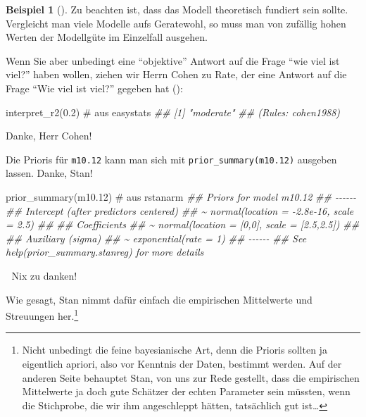 \documentclass[
  ngerman,
  letterpaper,
  twoside,
  open=any]{scrbook}
\newenvironment{Shaded}{\begin{snugshade}}{\end{snugshade}}
\newcommand{\CommentTok}[1]{\textcolor[rgb]{0.37,0.37,0.37}{#1}}
\newcommand{\DocumentationTok}[1]{\textcolor[rgb]{0.37,0.37,0.37}{\textit{#1}}}
\newcommand{\FloatTok}[1]{\textcolor[rgb]{0.68,0.00,0.00}{#1}}
\newcommand{\FunctionTok}[1]{\textcolor[rgb]{0.28,0.35,0.67}{#1}}
\newcommand{\NormalTok}[1]{\textcolor[rgb]{0.00,0.23,0.31}{#1}}
\theoremstyle{definition}
\newtheorem{example}{Beispiel}[chapter]
\theoremstyle{plain}
\theoremstyle{definition}
\theoremstyle{definition}
\theoremstyle{remark}
\begin{document}
\begin{example}[]
Zu beachten ist, dass das Modell theoretisch fundiert sein sollte.
Vergleicht man viele Modelle aufs Geratewohl, so muss man von zufällig
hohen Werten der Modellgüte im Einzelfall ausgehen.

Wenn Sie aber unbedingt eine \enquote{objektive} Antwort auf die Frage
\enquote{wie viel ist viel?} haben wollen, ziehen wir Herrn Cohen zu
Rate, der eine Antwort auf die Frage \enquote{Wie viel ist viel?}
gegeben hat ():

\begin{Shaded}
\begin{Highlighting}[]
\FunctionTok{interpret\_r2}\NormalTok{(}\FloatTok{0.2}\NormalTok{)  }\CommentTok{\# aus \textasciigrave{}easystats\textasciigrave{}}
\DocumentationTok{\#\# [1] "moderate"}
\DocumentationTok{\#\# (Rules: cohen1988)}
\end{Highlighting}
\end{Shaded}

Danke, Herr Cohen!

Die Prioris für \texttt{m10.12} kann man sich mit
\texttt{prior\_summary(m10.12)} ausgeben lassen. Danke, Stan!

\begin{Shaded}
\begin{Highlighting}[]
\FunctionTok{prior\_summary}\NormalTok{(m10}\FloatTok{.12}\NormalTok{)  }\CommentTok{\# aus rstanarm}
\DocumentationTok{\#\# Priors for model \textquotesingle{}m10.12\textquotesingle{} }
\DocumentationTok{\#\# {-}{-}{-}{-}{-}{-}}
\DocumentationTok{\#\# Intercept (after predictors centered)}
\DocumentationTok{\#\#  \textasciitilde{} normal(location = {-}2.8e{-}16, scale = 2.5)}
\DocumentationTok{\#\# }
\DocumentationTok{\#\# Coefficients}
\DocumentationTok{\#\#  \textasciitilde{} normal(location = [0,0], scale = [2.5,2.5])}
\DocumentationTok{\#\# }
\DocumentationTok{\#\# Auxiliary (sigma)}
\DocumentationTok{\#\#  \textasciitilde{} exponential(rate = 1)}
\DocumentationTok{\#\# {-}{-}{-}{-}{-}{-}}
\DocumentationTok{\#\# See help(\textquotesingle{}prior\_summary.stanreg\textquotesingle{}) for more details}
\end{Highlighting}
\end{Shaded}

\begin{displayquote}
🤖 Nix zu danken!
\end{displayquote}

Wie gesagt, Stan nimmt dafür einfach die empirischen Mittelwerte und
Streuungen her.\footnote{Nicht unbedingt die feine bayesianische Art,
  denn die Prioris sollten ja eigentlich apriori, also vor Kenntnis der
  Daten, bestimmt werden. Auf der anderen Seite behauptet Stan, von uns
  zur Rede gestellt, dass die empirischen Mittelwerte ja doch gute
  Schätzer der echten Parameter sein müssten, wenn die Stichprobe, die
  wir ihm angeschleppt hätten, tatsächlich gut ist\ldots{}}


\end{example}
\end{document}
